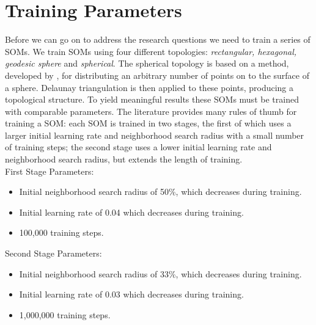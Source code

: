 


\section{Training Parameters}
\label{meth:train}
Before we can go on to address the research questions we need to train a
series of SOMs.  We train SOMs using four different topologies:
\emph{rectangular, hexagonal, geodesic sphere} and \emph{spherical}.  The spherical
topology is based on a method, developed by \cite{Rakhmanov94}, for
distributing an arbitrary number of points on to the surface of a sphere.
Delaunay triangulation is then applied to these points, producing a
topological structure.  To yield meaningful results these SOMs must be trained
with comparable parameters.  The literature provides many rules of thumb for
training a SOM: each SOM is trained in two stages, the first of which uses a larger
initial learning rate and neighborhood search radius with a small number of
training steps; the second stage uses a lower initial learning rate and
neighborhood search radius, but extends the length of training.
\\
First Stage Parameters:
\begin{itemize}
  \item Initial neighborhood search radius of 50\%, which decreases during training. 
  \item Initial learning rate of 0.04 which decreases during training.
  \item 100,000 training steps.
\end{itemize}
Second Stage Parameters:
\begin{itemize}
  \item Initial neighborhood search radius of 33\%, which decreases during training. 
  \item Initial learning rate of 0.03 which decreases during training.
  \item 1,000,000 training steps.
\end{itemize}

